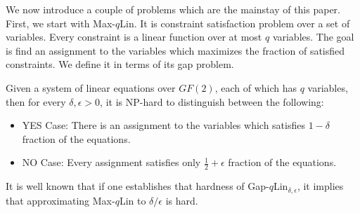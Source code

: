 {%


We now introduce a couple of problems which are the mainstay of this
paper. First, we start with {\sc Max-$q$Lin}.  It is constraint
satisfaction problem over a set of variables. Every constraint is a
linear function over at most $q$ variables. The goal is find an
assignment to the variables which maximizes the fraction of satisfied
constraints. We define it in terms of its gap problem.

\begin{theorem} Given a system
  of linear equations over $GF(2)$, each of which has $q$ variables,
  then for every $\delta, \epsilon > 0$, it is NP-hard to distinguish
  between the following:
\begin{itemize}
\item {\sf YES Case:} There is an assignment to the variables which
  satisfies $1-\delta$ fraction of the equations.
\item {\sf NO Case:} Every assignment satisfies only $\frac{1}{2} +
  \epsilon$ fraction of the equations.
\end{itemize}
\end{theorem}

It is well known that if one establishes that hardness of {\sc Gap-$q$Lin}$_{\delta, \epsilon}$, it implies that
approximating {\sc Max-$q$Lin} to $\delta/\epsilon$ is hard.}
